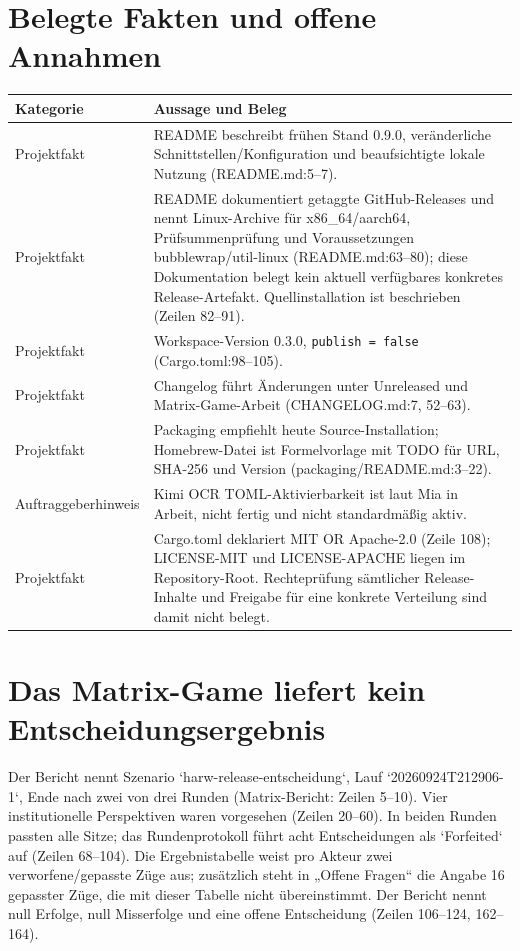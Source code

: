 \documentclass[11pt,a4paper]{scrartcl}
\begin{document}
\section{Belegte Fakten und offene Annahmen}\label{sec:fakten}
\begin{tabularx}{\textwidth}{@{}lL@{}}
\toprule
\textbf{Kategorie} & \textbf{Aussage und Beleg} \\
\midrule
Projektfakt & README beschreibt frühen Stand 0.9.0, veränderliche Schnittstellen/Konfiguration und beaufsichtigte lokale Nutzung (README.md:5--7). \\
Projektfakt & README dokumentiert getaggte GitHub-Releases und nennt Linux-Archive für x86\_64/aarch64, Prüfsummenprüfung und Voraussetzungen bubblewrap/util-linux (README.md:63--80); diese Dokumentation belegt kein aktuell verfügbares konkretes Release-Artefakt. Quellinstallation ist beschrieben (Zeilen 82--91). \\
Projektfakt & Workspace-Version 0.3.0, \texttt{publish = false} (Cargo.toml:98--105). \\
Projektfakt & Changelog führt Änderungen unter Unreleased und Matrix-Game-Arbeit (CHANGELOG.md:7, 52--63). \\
Projektfakt & Packaging empfiehlt heute Source-Installation; Homebrew-Datei ist Formelvorlage mit TODO für URL, SHA-256 und Version (packaging/README.md:3--22). \\
Auftraggeberhinweis & Kimi OCR TOML-Aktivierbarkeit ist laut Mia in Arbeit, nicht fertig und nicht standardmäßig aktiv. \\
Projektfakt & Cargo.toml deklariert MIT OR Apache-2.0 (Zeile 108); LICENSE-MIT und LICENSE-APACHE liegen im Repository-Root. Rechteprüfung sämtlicher Release-Inhalte und Freigabe für eine konkrete Verteilung sind damit nicht belegt. \\
\bottomrule
\end{tabularx}

\section{Das Matrix-Game liefert kein Entscheidungsergebnis}\label{sec:game}
Der Bericht nennt Szenario `harw-release-entscheidung`, Lauf `20260924T212906-1`, Ende nach zwei von drei Runden (Matrix-Bericht: Zeilen 5–10). Vier institutionelle Perspektiven waren vorgesehen (Zeilen 20–60). In beiden Runden passten alle Sitze; das Rundenprotokoll führt acht Entscheidungen als `Forfeited` auf (Zeilen 68–104). Die Ergebnistabelle weist pro Akteur zwei verworfene/gepasste Züge aus; zusätzlich steht in „Offene Fragen“ die Angabe 16 gepasster Züge, die mit dieser Tabelle nicht übereinstimmt. Der Bericht nennt null Erfolge, null Misserfolge und eine offene Entscheidung (Zeilen 106–124, 162–164).
\end{document}
